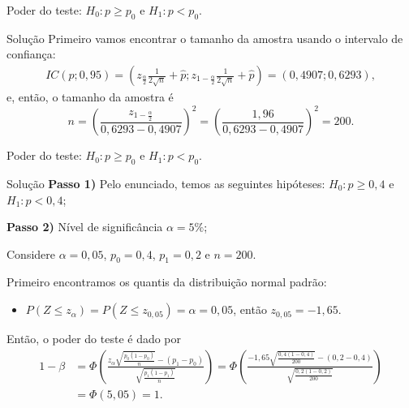 \documentclass[8pt]{beamer}
\begin{document}
\begin{frame}{Poder do teste: $H_0: p \geq p_0$ e $H_1: p < p_0$.}

\begin{block}{Solução}
	Primeiro vamos encontrar o tamanho da amostra usando o intervalo de confiança:
	\begin{align*}
	IC(p;0,95) = \left( z_\frac{\alpha}{2} \frac{1}{2\sqrt{n}} + \hat{p}; z_{1-\frac{\alpha}{2}} \frac{1}{2\sqrt{n}} + \hat{p} \right) = (0,4907; 0,6293),
	\end{align*}
	e, então, o tamanho da amostra é 
	$$n = \left( \frac{z_{1-\frac{\alpha}{2}}}{0,6293 - 0,4907} \right)^2 = \left( \frac{1,96}{0,6293 - 0,4907} \right)^2 = 200.$$	
\end{block}

\end{frame}

\begin{frame}{Poder do teste: $H_0: p \geq p_0$ e $H_1: p < p_0$.}

\normalsize

\begin{block}{Solução}
	\textbf{Passo 1)} Pelo enunciado, temos as seguintes hipóteses: $H_0: p \geq 0,4$ e $H_1: p < 0,4$;
	
	\textbf{Passo 2)} Nível de significância $\alpha=5\%$;
		
	Considere $\alpha=0,05$, $p_0=0,4$, $p_1=0,2$ e $n=200$. 
	
	Primeiro encontramos os quantis da distribuição normal padrão:
	\begin{itemize}
		\item $P\left( Z \leq z_{\alpha} \right) = P\left( Z \leq z_{0,05} \right) = \alpha  = 0,05$, então $z_{0,05} = -1,65$.
	\end{itemize}
	Então, o poder do teste é dado por
	\begin{align*}
		1-\beta &= \Phi \left( \frac{ z_\alpha \sqrt{ \frac{p_0(1 - p_0)}{n}} - (p_1 - p_0) }{ \sqrt{ \frac{ p_1(1-p_1) }{ n } } } \right) = \Phi \left( \frac{ -1,65 \sqrt{ \frac{0,4(1 - 0,4)}{200}} - (0,2 - 0,4) }{ \sqrt{ \frac{ 0,2(1-0,2) }{ 200 } } } \right)\\
		&= \Phi \left( 5,05\right) = 1.
	\end{align*}
\end{block}

\normalsize
\end{frame}
\end{document}
